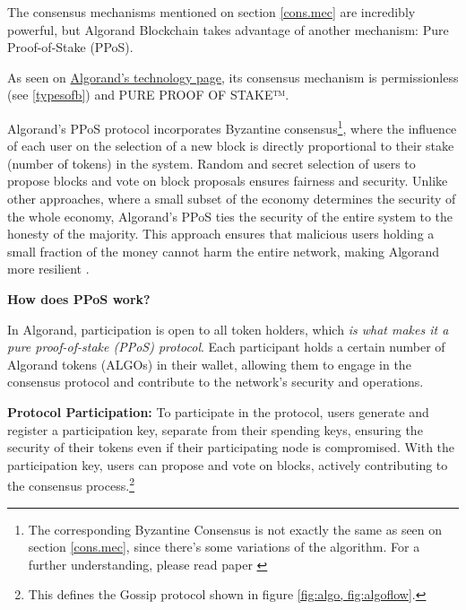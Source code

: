 
The consensus mechanisms mentioned on section \ref{cons.mec} are incredibly powerful, but Algorand Blockchain takes advantage of another mechanism: Pure Proof-of-Stake (PPoS).

As seen on \href{https://algorand.com/technology/algorand-protocol}{Algorand's technology page}, its consensus mechanism is permissionless (see \ref{typesofb}) and PURE PROOF OF STAKE™.\newline

Algorand's PPoS protocol incorporates Byzantine consensus\footnote{The corresponding Byzantine Consensus is not exactly the same as seen on section \ref{cons.mec}, since there's some variations of the algorithm. For a further understanding, please read paper \cite{algo}}, where the influence of each user on the selection of a new block is directly proportional to their stake (number of tokens) in the system. Random and secret selection of users to propose blocks and vote on block proposals ensures fairness and security. Unlike other approaches, where a small subset of the economy determines the security of the whole economy, Algorand's PPoS ties the security of the entire system to the honesty of the majority. This approach ensures that malicious users holding a small fraction of the money cannot harm the entire network, making Algorand more resilient \cite{alg}.\newline

\textbf{How does PPoS work?} \cite{alg, algo, ppow}\newline

In Algorand, participation is open to all token holders, which \textit{is what makes it a pure proof-of-stake (PPoS) protocol}. Each participant holds a certain number of Algorand tokens (ALGOs) in their wallet, allowing them to engage in the consensus protocol and contribute to the network's security and operations.\newline

\textbf{Protocol Participation:}
To participate in the protocol, users generate and register a participation key, separate from their spending keys, ensuring the security of their tokens even if their participating node is compromised. With the participation key, users can propose and vote on blocks, actively contributing to the consensus process.\footnote{This defines the Gossip protocol shown in figure \ref{fig:algo, fig:algoflow}.}\newline


